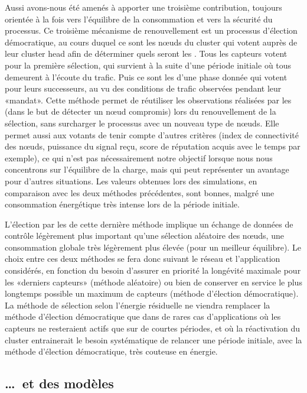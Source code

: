 Aussi avons-nous été amenés à apporter une troisième contribution, toujours orientée à la fois vers l'équilibre de la consommation et vers la sécurité du processus.
Ce troisième mécanisme de renouvellement est un processus d'élection démocratique, au cours duquel ce sont les nœuds du cluster qui votent auprès de leur cluster head afin de déterminer quels seront les \cnst.
Tous les capteurs votent pour la première sélection, qui survient à la suite d'une période initiale où tous demeurent à l'écoute du trafic.
Puis ce sont les \cnst d'une phase donnée qui votent pour leurs successeurs, au vu des conditions de trafic observées pendant leur «mandat».
Cette méthode permet de réutiliser les observations réalisées par les \cnst (dans le but de détecter un nœud compromis) lors du renouvellement de la sélection, sans surcharger le processus avec un nouveau type de nœuds.
Elle permet aussi aux votants de tenir compte d'autres critères (index de connectivité des nœuds, puissance du signal reçu, score de réputation acquis avec le temps par exemple), ce qui n'est pas nécessairement notre objectif lorsque nous nous concentrons sur l'équilibre de la charge, mais qui peut représenter un avantage pour d'autres situations.
Les valeurs obtenues lors des simulations, en comparaison avec les deux méthodes précédentes, sont bonnes, malgré une consommation énergétique très intense lors de la période initiale.

L'élection par les \cnst de cette dernière méthode implique un échange de données de contrôle légèrement plus important qu'une sélection aléatoire des nœuds, \cad une consommation globale très légèrement plus élevée (pour un meilleur équilibre).
Le choix entre ces deux méthodes se fera donc suivant le réseau et l'application considérés, en fonction du besoin d'assurer en priorité la longévité maximale pour les «derniers capteurs» (méthode aléatoire) ou bien de conserver en service le plus longtemps possible un maximum de capteurs (méthode d'élection démocratique).
La méthode de sélection selon l'énergie résiduelle ne viendra remplacer la méthode d'élection démocratique que dans de rares cas d'applications où les capteurs ne resteraient actifs que sur de courtes périodes, et où la réactivation du cluster entrainerait le besoin systématique de relancer une période initiale, avec la méthode d'élection démocratique, très couteuse en énergie.

    \subsection{\dots\ et des modèles}

